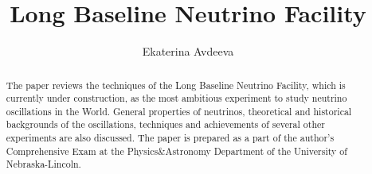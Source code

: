 \documentclass{article}
\begin{document}
 
\pagenumbering{}
\title{\textbf{Long Baseline Neutrino Facility}}

\author{Ekaterina Avdeeva}

\maketitle

\begin{abstract}
The paper reviews the techniques of the Long Baseline Neutrino Facility, which is currently under construction, as the most ambitious experiment to study neutrino oscillations in the World. General properties of neutrinos, theoretical and historical backgrounds of the oscillations, techniques and achievements of several other experiments are also discussed. The paper is prepared as a part of the author's Comprehensive Exam at the Physics\&Astronomy Department of the University of Nebraska-Lincoln.
\end{abstract}




\pagestyle{fancy}
\fancyhf{}
\lhead[]{\thepage}
\rhead[\thepage]{}

\tableofcontents

%

\clearpage

\clearpage

\clearpage

\clearpage

\clearpage

\clearpage
\end{document}
